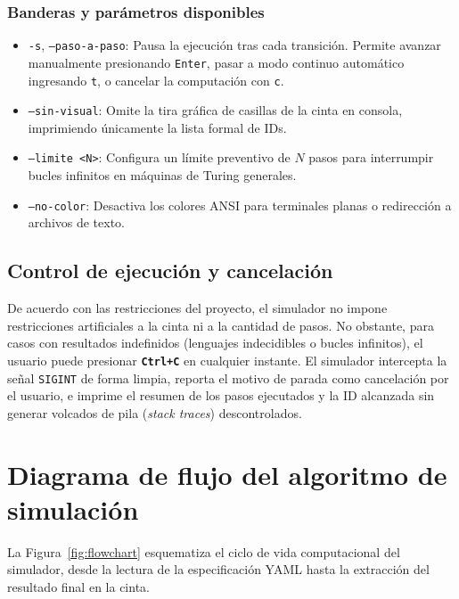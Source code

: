 \documentclass[11pt,letterpaper]{article}
\begin{document}
\subsubsection{Banderas y parámetros disponibles}
\begin{itemize}
    \item \texttt{-s}, \texttt{--paso-a-paso}: Pausa la ejecución tras cada transición. Permite avanzar manualmente presionando \texttt{Enter}, pasar a modo continuo automático ingresando \texttt{t}, o cancelar la computación con \texttt{c}.
    \item \texttt{--sin-visual}: Omite la tira gráfica de casillas de la cinta en consola, imprimiendo únicamente la lista formal de IDs.
    \item \texttt{--limite <N>}: Configura un límite preventivo de $N$ pasos para interrumpir bucles infinitos en máquinas de Turing generales.
    \item \texttt{--no-color}: Desactiva los colores ANSI para terminales planas o redirección a archivos de texto.
\end{itemize}

\subsection{Control de ejecución y cancelación}
De acuerdo con las restricciones del proyecto, el simulador no impone restricciones artificiales a la cinta ni a la cantidad de pasos. No obstante, para casos con resultados indefinidos (lenguajes indecidibles o bucles infinitos), el usuario puede presionar \textbf{\texttt{Ctrl+C}} en cualquier instante. El simulador intercepta la señal \texttt{SIGINT} de forma limpia, reporta el motivo de parada como cancelación por el usuario, e imprime el resumen de los pasos ejecutados y la ID alcanzada sin generar volcados de pila (\textit{stack traces}) descontrolados.

\section{Diagrama de flujo del algoritmo de simulación}

La Figura~\ref{fig:flowchart} esquematiza el ciclo de vida computacional del simulador, desde la lectura de la especificación YAML hasta la extracción del resultado final en la cinta.
\end{document}
